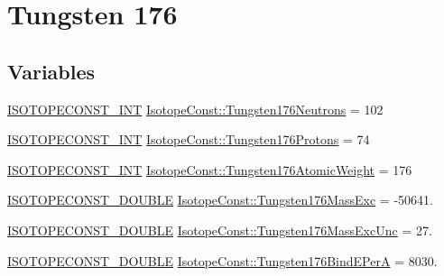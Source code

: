 \hypertarget{group___isotope_const-_tungsten-_w176}{}\section{Tungsten 176}
\label{group___isotope_const-_tungsten-_w176}
\subsection*{Variables}
\begin{DoxyCompactItemize}
\item 
\mbox{\hyperlink{group___isotope_const-_macros_ga5f18360b3e99483a35c32d789e62621c}{I\+S\+O\+T\+O\+P\+E\+C\+O\+N\+S\+T\+\_\+\+I\+NT}} \mbox{\hyperlink{group___isotope_const-_tungsten-_w176_ga1d46f03cbdd941505e7c27c7b9511935}{Isotope\+Const\+::\+Tungsten176\+Neutrons}} = 102
\item 
\mbox{\hyperlink{group___isotope_const-_macros_ga5f18360b3e99483a35c32d789e62621c}{I\+S\+O\+T\+O\+P\+E\+C\+O\+N\+S\+T\+\_\+\+I\+NT}} \mbox{\hyperlink{group___isotope_const-_tungsten-_w176_gace7b14f25cfaf399446380e4de6a9d52}{Isotope\+Const\+::\+Tungsten176\+Protons}} = 74
\item 
\mbox{\hyperlink{group___isotope_const-_macros_ga5f18360b3e99483a35c32d789e62621c}{I\+S\+O\+T\+O\+P\+E\+C\+O\+N\+S\+T\+\_\+\+I\+NT}} \mbox{\hyperlink{group___isotope_const-_tungsten-_w176_gaa8b58782034ccd0985fbb2cecd536e9e}{Isotope\+Const\+::\+Tungsten176\+Atomic\+Weight}} = 176
\item 
\mbox{\hyperlink{group___isotope_const-_macros_ga8f45a7272ce02c0b4c65c44636ed719a}{I\+S\+O\+T\+O\+P\+E\+C\+O\+N\+S\+T\+\_\+\+D\+O\+U\+B\+LE}} \mbox{\hyperlink{group___isotope_const-_tungsten-_w176_gabb6ebb12d28a752f0ddbb4528c98a87e}{Isotope\+Const\+::\+Tungsten176\+Mass\+Exc}} = -\/50641.
\item 
\mbox{\hyperlink{group___isotope_const-_macros_ga8f45a7272ce02c0b4c65c44636ed719a}{I\+S\+O\+T\+O\+P\+E\+C\+O\+N\+S\+T\+\_\+\+D\+O\+U\+B\+LE}} \mbox{\hyperlink{group___isotope_const-_tungsten-_w176_ga5eafd2735b9848ce3e1f38fc7580e06f}{Isotope\+Const\+::\+Tungsten176\+Mass\+Exc\+Unc}} = 27.
\item 
\mbox{\hyperlink{group___isotope_const-_macros_ga8f45a7272ce02c0b4c65c44636ed719a}{I\+S\+O\+T\+O\+P\+E\+C\+O\+N\+S\+T\+\_\+\+D\+O\+U\+B\+LE}} \mbox{\hyperlink{group___isotope_const-_tungsten-_w176_ga437b067b39a6f3c20471c2ef1839315e}{Isotope\+Const\+::\+Tungsten176\+Bind\+E\+PerA}} = 8030.
\item 

\end{DoxyCompactItemize}
